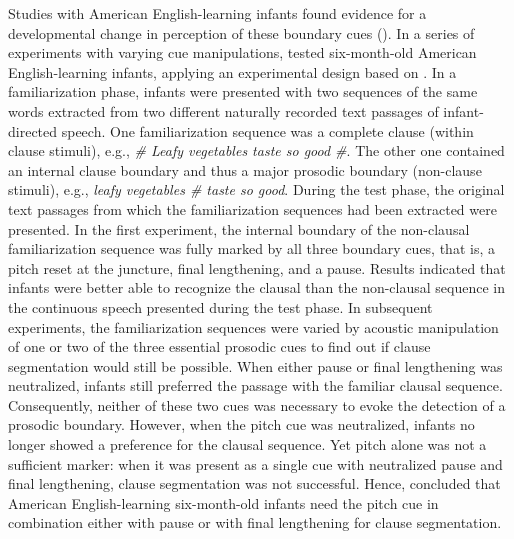\documentclass[output=paper]{langscibook}
\begin{document}
Studies with American English-learning infants found evidence for a developmental change in perception of these boundary cues (\citealt{Seidl2007, Seidl2008}). In a series of experiments with varying cue manipulations, \citet{Seidl2007} tested six-month-old American English-learning infants, applying an experimental design based on \citet{Nazzi2000}. In a familiarization phase, infants were presented with two sequences of the same words extracted from two different naturally recorded text passages of infant-directed speech. One familiarization sequence was a complete clause (within clause stimuli), e.g., \textit{\# Leafy vegetables taste so good \#}. The other one contained an internal clause boundary and thus a major prosodic boundary (non-clause stimuli), e.g., \textit{leafy vegetables \# taste so good}. During the test phase, the original text passages from which the familiarization sequences had been extracted were presented. In the first experiment, the internal boundary of the non-clausal familiarization sequence was fully marked by all three boundary cues, that is, a pitch reset at the juncture, final lengthening, and a pause. Results indicated that infants were better able to recognize the clausal than the non-clausal sequence in the continuous speech presented during the test phase. In subsequent experiments, the familiarization sequences were varied by acoustic manipulation of one or two of the three essential prosodic cues to find out if clause segmentation would still be possible. When either pause or final lengthening was neutralized, infants still preferred the passage with the familiar clausal sequence. Consequently, neither of these two cues was necessary to evoke the detection of a prosodic boundary. However, when the pitch cue was neutralized, infants no longer showed a preference for the clausal sequence. Yet pitch alone was not a sufficient marker: when it was present as a single cue with neutralized pause and final lengthening, clause segmentation was not successful. Hence, \citet{Seidl2007} concluded that American English-learning six-month-old infants need the pitch cue in combination either with pause or with final lengthening for clause segmentation.
\end{document}

